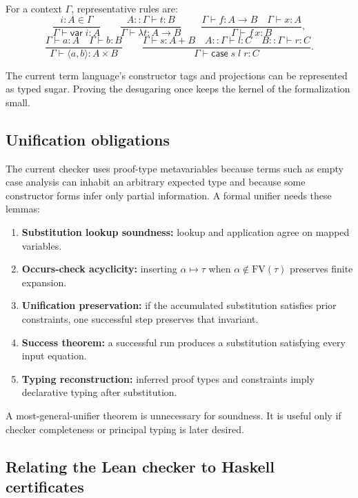\documentclass[11pt,letterpaper,openany]{report}
\theoremstyle{definition}
\theoremstyle{remark}
\begin{document}
For a context \(\Gamma\), representative rules are:
\[
\frac{i:A\in\Gamma}{\Gamma\vdash \mathsf{var}\;i:A}
\qquad
\frac{A::\Gamma\vdash t:B}{\Gamma\vdash \lambda t:A\to B}
\qquad
\frac{\Gamma\vdash f:A\to B \quad \Gamma\vdash x:A}{\Gamma\vdash f\,x:B},
\]
\[
\frac{\Gamma\vdash a:A \quad \Gamma\vdash b:B}{\Gamma\vdash \langle a,b\rangle:A\times B}
\qquad
\frac{\Gamma\vdash s:A+B \quad A::\Gamma\vdash l:C \quad B::\Gamma\vdash r:C}
     {\Gamma\vdash \mathsf{case}\;s\;l\;r:C}.
\]

The current term language's constructor tags and projections can be represented as typed sugar. Proving the desugaring once keeps the kernel of the formalization small.

\subsection{Unification obligations}

The current checker uses proof-type metavariables because terms such as empty case analysis can inhabit an arbitrary expected type and because some constructor forms infer only partial information. A formal unifier needs these lemmas:

\begin{enumerate}
\item \textbf{Substitution lookup soundness:} lookup and application agree on mapped variables.
\item \textbf{Occurs-check acyclicity:} inserting \(\alpha\mapsto \tau\) when \(\alpha\notin\mathrm{FV}(\tau)\) preserves finite expansion.
\item \textbf{Unification preservation:} if the accumulated substitution satisfies prior constraints, one successful step preserves that invariant.
\item \textbf{Success theorem:} a successful run produces a substitution satisfying every input equation.
\item \textbf{Typing reconstruction:} inferred proof types and constraints imply declarative typing after substitution.
\end{enumerate}

A most-general-unifier theorem is unnecessary for soundness. It is useful only if checker completeness or principal typing is later desired.

\subsection{Relating the Lean checker to Haskell certificates}
\end{document}
